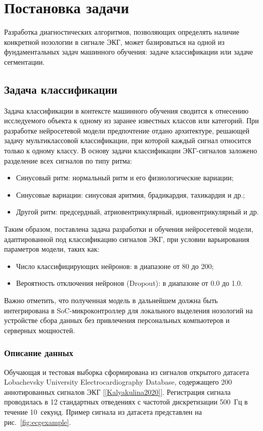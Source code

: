 \documentclass[10pt,a4paper]{book}
\begin{document}
\section{Постановка задачи}
\label{sec-problem}

Разработка диагностических алгоритмов, позволяющих определять наличие конкретной нозологии в сигнале ЭКГ, может базироваться на одной из фундаментальных задач машинного обучения: задаче классификации или задаче сегментации.

\subsection{Задача классификации}
Задача классификации в контексте машинного обучения сводится к отнесению исследуемого объекта к одному из заранее известных классов или категорий. При разработке нейросетевой модели предпочтение отдано архитектуре, решающей задачу мультиклассовой классификации, при которой каждый сигнал относится только к одному классу. В основу задачи классификации ЭКГ-сигналов заложено разделение всех сигналов по типу ритма:
\begin{itemize}
  \item Синусовый ритм: нормальный ритм и его физиологические вариации;
  \item Синусовые вариации: синусовая аритмия, брадикардия, тахикардия и др.;
  \item Другой ритм: предсердный, атриовентрикулярный, идиовентрикулярный и др.
\end{itemize}

Таким образом, поставлена задача разработки и обучения нейросетевой модели, адаптированной под классификацию сигналов ЭКГ, при условии варьирования параметров модели, таких как:
\begin{itemize}
  \item Число классифицирующих нейронов: в диапазоне от 80 до 200;
  \item Вероятность отключения нейронов (Dropout): в диапазоне от 0.0 до 1.0.
\end{itemize}
Важно отметить, что полученная модель в дальнейшем должна быть интегрирована в SoC-микроконтроллер для локального выделения нозологий на устройстве сбора данных без привлечения персональных компьютеров и серверных мощностей.

\subsubsection{Описание данных}
Обучающая и тестовая выборка сформирована из сигналов открытого датасета Lobachevsky University Electrocardiography Database, содержащего 200 аннотированных сигналов ЭКГ [\ref{Kalyakulina2020}]. Регистрация сигнала проводилась в 12 стандартных отведениях с частотой дискретизации 500~Гц в течение 10~секунд. Пример сигнала из датасета представлен на рис.~\ref{fig:ecgexample}.
\end{document}
